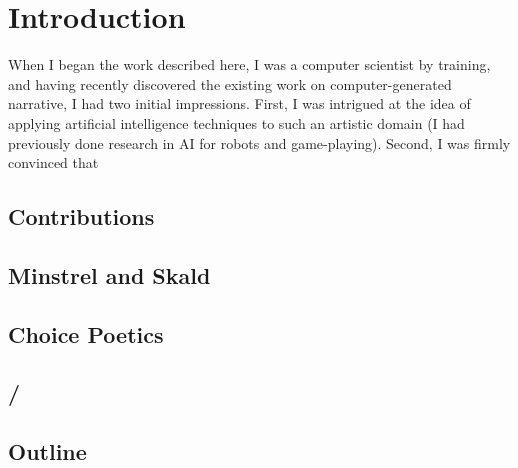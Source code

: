 \chapter{Introduction}

When I began the work described here, I was a computer scientist by training, and having recently discovered the existing work on computer-generated narrative, I had two initial impressions.
%
First, I was intrigued at the idea of applying artificial intelligence techniques to such an artistic domain (I had previously done research in AI for robots and game-playing).
%
Second, I was firmly convinced that 

\section{Contributions}

\section{Minstrel and Skald}

\section{Choice Poetics}

\section{\dunyazad/}

\section{Outline}
